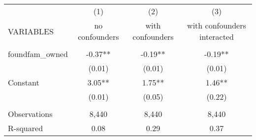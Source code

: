 \begin{tabular}{lccc} \hline
 & (1) & (2) & (3) \\
VARIABLES & no confounders & with confounders & with confounders interacted \\ \hline
 &  &  &  \\
foundfam\_owned & -0.37** & -0.19** & -0.19** \\
 & (0.01) & (0.01) & (0.01) \\
Constant & 3.05** & 1.75** & 1.46** \\
 & (0.01) & (0.05) & (0.22) \\
 &  &  &  \\
Observations & 8,440 & 8,440 & 8,440 \\
 R-squared & 0.08 & 0.29 & 0.37 \\ \hline
\end{tabular}
